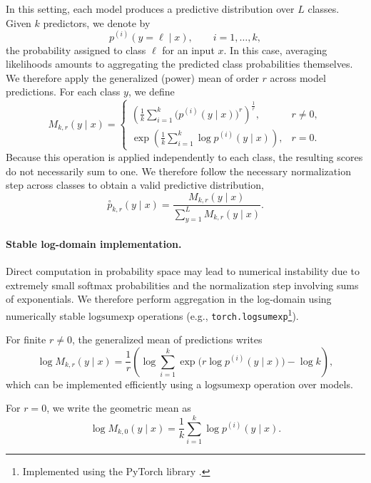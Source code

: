 \documentclass[accepted]{uai2026} %
\newcommand{\compose}[1]{\overset{\circ}{#1}}
\begin{document}
In this setting, each model produces a predictive distribution over $L$ classes. 
Given $k$ predictors, we denote by
\begin{equation}
p^{(i)}(y=\ell \mid x), \qquad i=1,\dots,k,
\end{equation}
the probability assigned to class $\ell$ for an input $x$. In this case, averaging likelihoods amounts to aggregating the predicted class probabilities themselves. We therefore apply the generalized (power) mean of order $r$ across model predictions. 
For each class $y$, we define
\begin{equation}
M_{k,r}(y \mid x)
=
\begin{cases}
\left(
\frac{1}{k}
\sum_{i=1}^{k}
\big(p^{(i)}(y \mid x)\big)^r
\right)^{\frac{1}{r}}, & r \neq 0, \\[6pt]
\exp\!\left(
\frac{1}{k}
\sum_{i=1}^{k}
\log p^{(i)}(y \mid x)
\right), & r=0 .
\end{cases}
\end{equation} Because this operation is applied independently to each class, the resulting scores do not necessarily sum to one. We therefore follow the necessary normalization step across classes to obtain a valid predictive distribution,
\begin{equation}
\compose{p}_{k,r}(y \mid x)
=
\frac{M_{k,r}(y \mid x)}
{\sum_{y=1}^{L} M_{k,r}(y \mid x)}.
\end{equation}

\paragraph{Stable log-domain implementation.}
Direct computation in probability space may lead to numerical instability due to extremely small softmax probabilities and the normalization step involving sums of exponentials. We therefore perform aggregation in the log-domain using numerically stable $\mathrm{logsumexp}$ operations (e.g., \texttt{torch.logsumexp}\footnote{Implemented using the PyTorch library \citep{paszke2019pytorch}.}).

For finite $r \neq 0$, the generalized mean of predictions writes
\begin{equation}
\log M_{k,r}(y \mid x)
=
\frac{1}{r}
\left(
\log
\sum_{i=1}^{k}
\exp\!\big(r \log p^{(i)}(y \mid x)\big)
-
\log k
\right),
\end{equation}
which can be implemented efficiently using a $\mathrm{logsumexp}$ operation over models.

For $r=0$, we write the geometric mean as
\begin{equation}
\log M_{k,0}(y \mid x)
=
\frac{1}{k}
\sum_{i=1}^{k}
\log p^{(i)}(y \mid x).
\end{equation}
\end{document}
